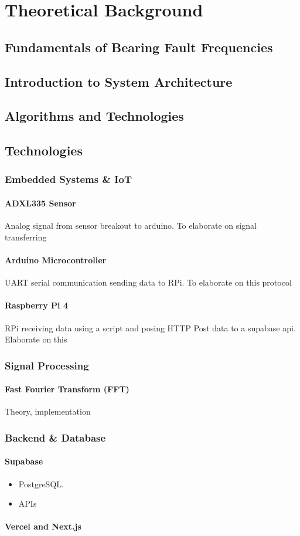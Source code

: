 \chapter{Theoretical Background}
\label{chap2}
\section{Fundamentals of Bearing Fault Frequencies}

\section{Introduction to System Architecture}

\section{Algorithms and Technologies}

\section{Technologies}
\subsection{Embedded Systems \& IoT}
\subsubsection{ADXL335 Sensor}
Analog signal from sensor breakout to arduino. To elaborate on signal transferring
\subsubsection{Arduino Microcontroller}
UART serial communication sending data to RPi. To elaborate on this protocol
\subsubsection{Raspberry Pi 4}
RPi receiving data using a script and posing HTTP Post data to a supabase api. Elaborate on this


\subsection{Signal Processing}
\subsubsection{Fast Fourier Transform (FFT)}
Theory, implementation

\subsection{Backend \& Database}
\subsubsection{Supabase}
\begin{itemize}  
	\item PostgreSQL. 
	\item APIs
\end{itemize}  
\subsubsection{Vercel and Next.js}

